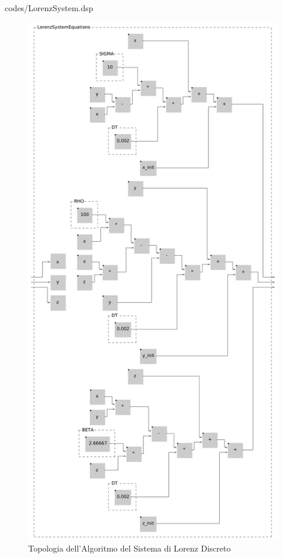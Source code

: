 \vspace{0.5cm} 

{codes/LorenzSystem.dsp}
\clearpage

\begin{figure}[h!]
\begin{center}
    \includegraphics[width=11.5cm]{figures/LorenzSystemInside.pdf} 
    \caption{Topologia dell'Algoritmo del Sistema di Lorenz Discreto} 
\end{center}
\vspace{0.5cm}
\end{figure}
\clearpage

